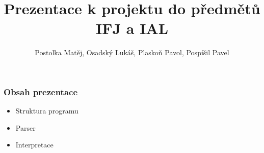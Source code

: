 \documentclass[pdf]{beamer}
\title{Prezentace k projektu do předmětů IFJ a IAL}
\author{Postolka Matěj, Osadský Lukáš, Plaskoň Pavol, Pospíšil Pavel}
\begin{document}

\begin{frame}
  \titlepage
\end{frame}


\begin{frame}
  \frametitle{Obsah prezentace}
  \LARGE
  \begin{itemize}
    \item Struktura programu
	\item Parser
	\item Interpretace
 \end{itemize}
\end{frame}

\end{document}
